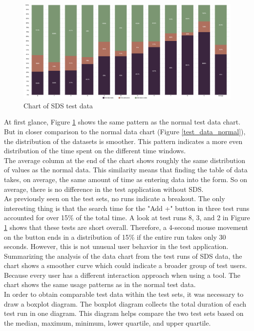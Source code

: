 \begin{figure}[htbp]
    \centerline{
    \includegraphics[width=\linewidth]{images/sds_test_data_chart.png}}
\caption{Chart of \ac{SDS} test data}
\label{test_data_sds}
\end{figure}
At first glance, Figure \ref{test_data_sds} shows the same pattern as the normal test data chart. But in closer comparison to the normal data chart (Figure \ref{test_data_normal}), the distribution of the datasets is smoother. This pattern indicates a more even distribution of the time spent on the different time windows. \\
The average column at the end of the chart shows roughly the same distribution of values as the normal data. This similarity means that finding the table of data takes, on average, the same amount of time as entering data into the form. So on average, there is no difference in the test application without \ac{SDS}. \\
As previously seen on the test sets, no runs indicate a breakout. The only interesting thing is that the search time for the "Add +" button in three test runs accounted for over 15\% of the total time. A look at test runs 8, 3, and 2 in Figure \ref{test_data_sds} shows that these tests are short overall. Therefore, a 4-second mouse movement on the button ends in a distribution of 15\% if the entire run takes only 30 seconds. However, this is not unusual user behavior in the test application.\\
Summarizing the analysis of the data chart from the test runs of SDS data, the chart shows a smoother curve which could indicate a broader group of test users. Because every user has a different interaction approach when using a tool. The chart shows the same usage patterns as in the normal test data.  \\

In order to obtain comparable test data within the test sets, it was necessary to draw a boxplot diagram. The boxplot diagram collects the total duration of each test run in one diagram. This diagram helps compare the two test sets based on the median, maximum, minimum, lower quartile, and upper quartile. \\

